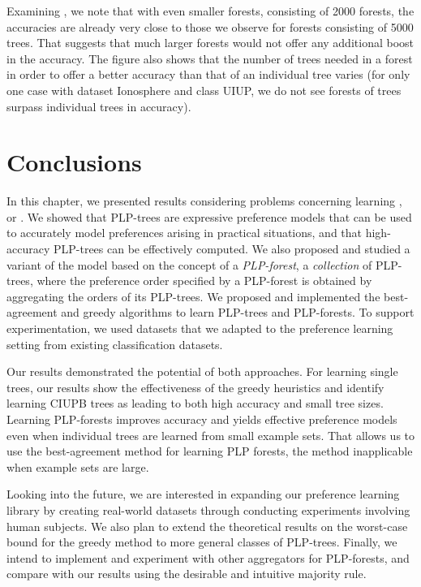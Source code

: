 Examining , we note that with even smaller forests, consisting
of 2000 forests, the accuracies are already very close to those we observe 
for forests consisting of 5000 trees. That suggests that much larger forests
would not offer any additional boost in the accuracy.
The figure also shows that the number of trees needed in a forest in order to
offer a better accuracy than that of an individual tree varies (for only 
one case with dataset Ionosphere and class UIUP, we do not see forests 
of trees surpass individual trees in accuracy).

\section{Conclusions}
In this chapter, we presented results considering problems concerning learning
, or .
We showed that PLP-trees are expressive preference models that can be
used to accurately model preferences arising in practical situations, and
that high-accuracy PLP-trees can be effectively computed. We also proposed
and studied a variant of the model based on the concept of a \emph{PLP-forest},
a \emph{collection} of PLP-trees, where the preference order specified by a
PLP-forest is obtained by aggregating the orders of its PLP-trees.
We proposed and implemented the best-agreement and greedy algorithms
to learn PLP-trees and PLP-forests. To support experimentation, we used
datasets that we adapted to the preference learning setting from existing
classification datasets.

Our results demonstrated the potential of both approaches. For learning 
single trees, our results show the effectiveness of the greedy heuristics 
and identify learning CIUPB trees as leading to both high accuracy and small
tree sizes. Learning PLP-forests improves accuracy and yields effective
preference models even when individual trees are learned from small example
sets. That allows us to use the best-agreement method for learning
PLP forests, the method inapplicable when example sets are large.

Looking into the future, we are interested in expanding our preference
learning library by creating real-world datasets through
conducting experiments involving human subjects.
We also plan to extend the theoretical results on the worst-case
bound for the greedy method to more general classes of PLP-trees.
Finally, we intend to implement and experiment with other aggregators
for PLP-forests, and compare with our results using
the desirable and intuitive majority rule.

